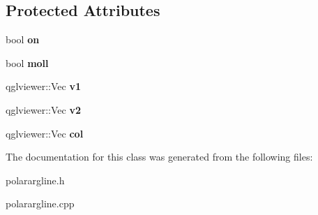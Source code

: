 \subsection*{Protected Attributes}
\begin{DoxyCompactItemize}
\item 
\hypertarget{classPolarArgLine_a7b9407f60e86a9e8829776bbd927c330}{
bool {\bfseries on}}
\label{classPolarArgLine_a7b9407f60e86a9e8829776bbd927c330}

\item 
\hypertarget{classPolarArgLine_a3aef18fbeabf58e62e21f63c2fe50661}{
bool {\bfseries moll}}
\label{classPolarArgLine_a3aef18fbeabf58e62e21f63c2fe50661}

\item 
\hypertarget{classPolarArgLine_a59fe73224d7e6da6661a716f72f7559f}{
qglviewer::Vec {\bfseries v1}}
\label{classPolarArgLine_a59fe73224d7e6da6661a716f72f7559f}

\item 
\hypertarget{classPolarArgLine_ad846549250692ec381d2ae08a588214e}{
qglviewer::Vec {\bfseries v2}}
\label{classPolarArgLine_ad846549250692ec381d2ae08a588214e}

\item 
\hypertarget{classPolarArgLine_a488c58bfca256af31d4a0e861610eba2}{
qglviewer::Vec {\bfseries col}}
\label{classPolarArgLine_a488c58bfca256af31d4a0e861610eba2}

\end{DoxyCompactItemize}


The documentation for this class was generated from the following files:\begin{DoxyCompactItemize}
\item 
polarargline.h\item 
polarargline.cpp\end{DoxyCompactItemize}
